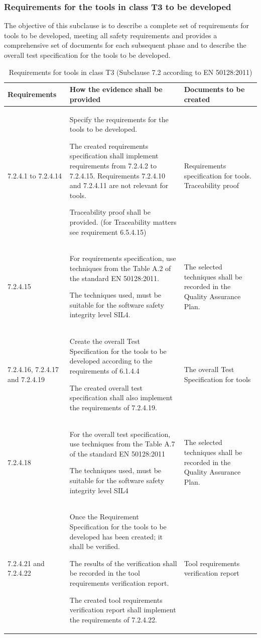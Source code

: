 \documentclass{template/openetcs_report}
\begin{document}
\subsubsection{Requirements for the tools in class T3 to be developed}
\begin{flushleft}
The objective of this subclause is to describe a complete set of requirements for  tools to be developed, meeting all safety requirements and provides a comprehensive set of documents for each subsequent phase and to describe the overall test specification for the tools to be developed.
\end{flushleft}
{\footnotesize\sffamily\centering
\begin{longtable}{|p{2cm}|p{9cm}|p{3cm}|}
\caption{Requirements for tools in class T3 (Subclause 7.2 according to EN 50128:2011)}\\
\hline
\bfseries Requirements & \bfseries How the evidence shall be provided & \bfseries Documents to be created\\
\hline
\hline
\endhead
\hline
\endfoot

7.2.4.1 to 7.2.4.14 & Specify the requirements for the tools to be developed.

The created requirements specification shall implement requirements from 7.2.4.2 to 7.2.4.15.
Requirements 7.2.4.10 and 7.2.4.11 are not relevant for tools.

Traceability proof shall be provided. (for Traceability matters see requirement 6.5.4.15)
& Requirements specification for tools.
Traceability proof\\ 
\hline
7.2.4.15 & For requirements specification, use techniques from the Table A.2 of the standard EN 50128:2011.

The techniques used, must be suitable for the software safety integrity level SIL4.
& The selected techniques shall be recorded in the Quality Assurance Plan.\\ 
\hline
7.2.4.16, 7.2.4.17 and 7.2.4.19 & Create the overall Test Specification for the tools to be developed according to the requirements of 6.1.4.4

The created overall test specification shall also implement the requirements of 7.2.4.19.
& The overall Test Specification for tools\\ 
\hline
7.2.4.18 & For the overall test specification, use techniques from the Table A.7 of the standard EN 50128:2011

The techniques used, must be suitable for the software safety integrity level SIL4
& The selected techniques shall be recorded in the Quality Assurance Plan.\\ 
\hline
7.2.4.21 and 7.2.4.22 & Once the Requirement Specification for the tools to be developed has been created; it shall be verified. 

The results of the verification shall be recorded in the tool requirements verification report.

The created tool requirements verification report shall implement the requirements of 7.2.4.22.
& Tool requirements verification report \\ 
\hline
\end{longtable}}
\end{document}
